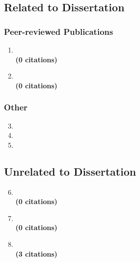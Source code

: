 \documentclass[11pt, a4paper]{book}
\begin{document}
\ListOfPublications{}

\subsection*{Related to Dissertation}
\subsubsection*{Peer-reviewed Publications}

\begin{enumerate}
  \item {} \\
  \textbf{(0 citations)}
  \item {} \\
  \textbf{(0 citations)}
\end{enumerate}

\subsubsection*{Other}
\begin{enumerate}
  \setcounter{enumi}{2}
  \item {}
  \item {}
  \item {}
\end{enumerate}

\subsection*{Unrelated to Dissertation}

\begin{enumerate}
  \setcounter{enumi}{5}
  \item {} \\
  \textbf{(0 citations)}
  \item {} \\
  \textbf{(0 citations)}
  \item {} \\
  \textbf{(3 citations)}
\end{enumerate}
\end{document}

